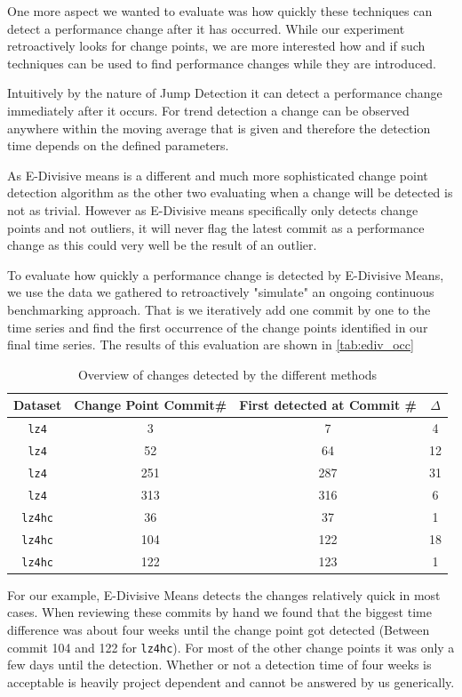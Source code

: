 \documentclass[	runningheads,
				a4paper]{llncs}
\begin{document}
One more aspect we wanted to evaluate was how quickly these techniques can detect a performance change after it has occurred. While our experiment retroactively looks for change points, we are more interested how and if such techniques can be used to find performance changes while they are introduced.

Intuitively by the nature of Jump Detection it can detect a performance change immediately after it occurs. For trend detection a change can be observed anywhere within the moving average that is given and therefore the detection time depends on the defined parameters.

As E-Divisive means is a different and much more sophisticated change point detection algorithm as the other two evaluating when a change will be detected is not as trivial. However as E-Divisive means specifically only detects change points and not outliers, it will never flag the latest commit as a performance change as this could very well be the result of an outlier.

To evaluate how quickly a performance change is detected by E-Divisive Means, we use the data we gathered to retroactively "simulate" an ongoing continuous benchmarking approach. That is we iteratively add one commit by one to the time series and find the first occurrence of the change points identified in our final time series. The results of this evaluation are shown in \autoref{tab:ediv_occ}

\begin{table}
	\centering
	\begin{tabular}{|c||c|c|c|}
		\hline
		\textbf{Dataset}&\textbf{Change Point Commit\#}&\textbf{First detected at Commit \#}&\textbf{$\Delta$}
		\\\hline\hline
		\texttt{lz4}&3&7&4
		\\\hline
		\texttt{lz4}&52&64&12
		\\\hline
		\texttt{lz4}&251&287&31
		\\\hline
		\texttt{lz4}&313&316&6
		\\\hline
		\texttt{lz4hc}&36&37&1
		\\\hline
		\texttt{lz4hc}&104&122&18
		\\\hline
		\texttt{lz4hc}&122&123&1
		\\\hline
	\end{tabular}
	\caption{Overview of changes detected by the different methods}
	\label{tab:ediv_occ}
\end{table}

For our example, E-Divisive Means detects the changes relatively quick in most cases. When reviewing these commits by hand we found that the biggest time difference was about four weeks until the change point got detected (Between commit 104 and 122 for \texttt{lz4hc}). For most of the other change points it was only a few days until the detection. Whether or not a detection time of four weeks is acceptable is heavily project dependent and cannot be answered by us generically.
\end{document}
